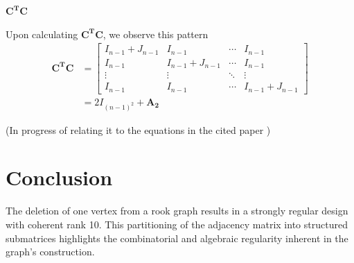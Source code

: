 \documentclass{article}
\begin{document}
\paragraph{\(\mathbf{C^T C}\)}
Upon calculating \(\mathbf{C^T C}\), we observe this pattern
\begin{align*}
\mathbf{C^T C} &=
\begin{bmatrix}
    I_{n-1} + J_{n-1} & I_{n-1} & \cdots & I_{n-1} \\
    I_{n-1} & I_{n-1} + J_{n-1} & \cdots & I_{n-1} \\
    \vdots & \vdots & \ddots & \vdots \\
    I_{n-1} & I_{n-1} & \cdots & I_{n-1} + J_{n-1}
\end{bmatrix} \\
&=
2I_{(n-1)^2} + \mathbf{A_2} 
\end{align*}

(In progress of relating it to the equations in the cited paper \cite{sankey_srd})


\newpage
\section*{Conclusion}

The deletion of one vertex from a rook graph results in a strongly regular design with coherent rank 10. This partitioning of the adjacency matrix into structured submatrices highlights the combinatorial and algebraic regularity inherent in the graph's construction. 




\end{document}
